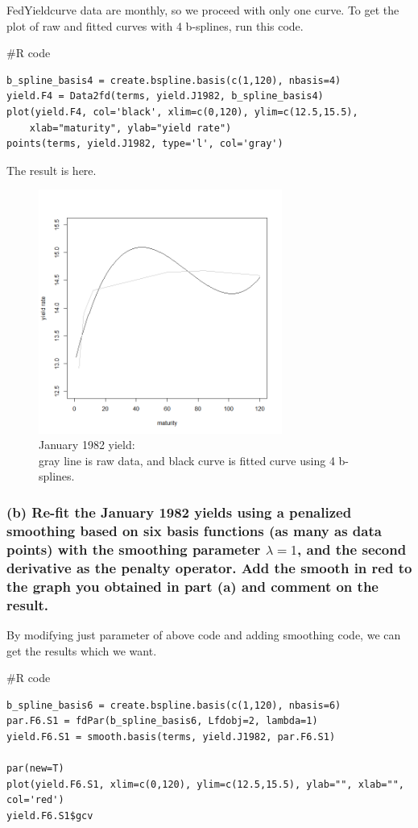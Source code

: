 \documentclass{article}
\newenvironment{Rcode}%
{%
    \begin{mdframed}
    \#R code
    \begin{small}
}
{%
    \end{small}
    \end{mdframed}
}
\begin{document}
FedYieldcurve data are monthly, so we proceed with only one curve.
To get the plot of raw and fitted curves with 4 b-splines, run this code.
\begin{Rcode}
    \begin{verbatim}
b_spline_basis4 = create.bspline.basis(c(1,120), nbasis=4)
yield.F4 = Data2fd(terms, yield.J1982, b_spline_basis4)
plot(yield.F4, col='black', xlim=c(0,120), ylim=c(12.5,15.5), 
    xlab="maturity", ylab="yield rate")
points(terms, yield.J1982, type='l', col='gray')
    \end{verbatim}
\end{Rcode}
The result is here.
\begin{figure}[hh]
    \centering
    \includegraphics[height=8cm]{1982Jyield_raw_bspline4.png}
    \caption{January 1982 yield:\\ gray line is raw data, and black curve is fitted curve using 4 b-splines.}
\end{figure}


\newpage
\subsubsection*{(b) Re-fit the January 1982 yields using a penalized smoothing based on six basis functions 
(as many as data points) with the smoothing parameter $\lambda = 1$, 
and the second derivative as the penalty operator. Add the smooth in red to the graph you obtained 
in part (a) and comment on the result.}

By modifying just parameter of above code and adding smoothing code, we can get the results which we want.
\begin{Rcode}
    \begin{verbatim}
b_spline_basis6 = create.bspline.basis(c(1,120), nbasis=6)
par.F6.S1 = fdPar(b_spline_basis6, Lfdobj=2, lambda=1)
yield.F6.S1 = smooth.basis(terms, yield.J1982, par.F6.S1)

par(new=T)
plot(yield.F6.S1, xlim=c(0,120), ylim=c(12.5,15.5), ylab="", xlab="", col='red')
yield.F6.S1$gcv
    \end{verbatim}
\end{Rcode}
\end{document}
